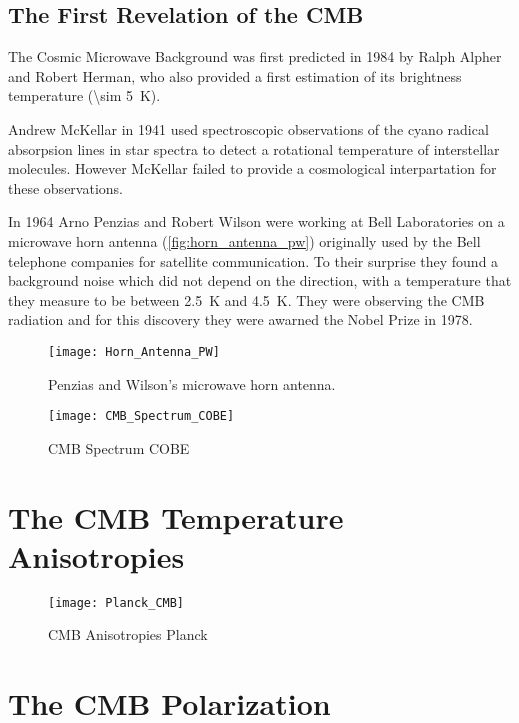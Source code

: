 \subsection{The First Revelation of the CMB}

The Cosmic Microwave Background was first predicted in 1984 by Ralph Alpher
and Robert Herman, who also provided a first estimation of its brightness
temperature (\SI{\sim 5}{\kelvin}).

Andrew McKellar in 1941 used spectroscopic observations of the cyano radical
absorpsion lines in star spectra to detect a rotational temperature of
interstellar molecules. However McKellar failed to provide a cosmological
interpartation for these observations. 

In 1964 Arno Penzias and Robert Wilson were working at Bell Laboratories
on a microwave horn antenna (\autoref{fig:horn_antenna_pw}) originally used by
the Bell telephone companies for satellite communication.
To their surprise they found a background noise which did not depend on the
direction, with a temperature that they measure to be between
\SI{2.5}{\kelvin} and \SI{4.5}{\kelvin}. They were observing the CMB
radiation and for this discovery they were awarned the Nobel Prize in 1978.

\begin{figure}
        \centering
        \texttt{[image: Horn\_Antenna\_PW]}
        \caption{Penzias and Wilson's microwave horn antenna.}
        \label{fig:horn_antenna_pw}
\end{figure}

\begin{figure}
        \centering
        \texttt{[image: CMB\_Spectrum\_COBE]}
        \caption{CMB Spectrum COBE}
        \label{fig:cmb_spectrum_cobe}
\end{figure}

\section{The CMB Temperature Anisotropies}

\begin{figure}
        \centering
        \texttt{[image: Planck\_CMB]}
        \caption{CMB Anisotropies Planck}
        \label{fig:plack_cmb}
\end{figure}

\section{The CMB Polarization}
